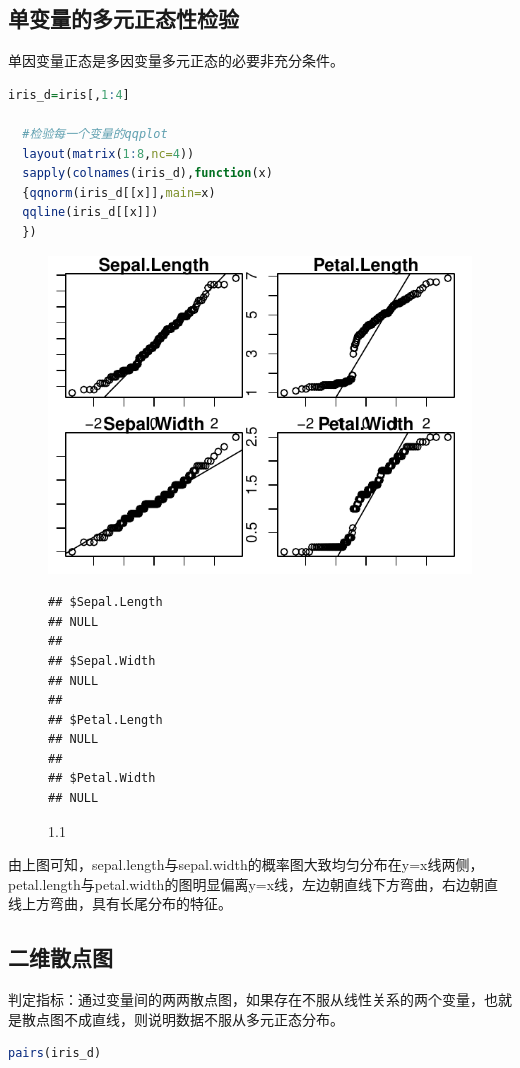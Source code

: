 \documentclass[11pt,a4paper]{article}\usepackage[]{graphicx}\usepackage[]{color}
\makeatletter
\def\maxwidth{ %
  \ifdim\Gin@nat@width>\linewidth
    \linewidth
  \else
    \Gin@nat@width
  \fi
}
\newenvironment{kframe}{%
 \def\at@end@of@kframe{}%
 \ifinner\ifhmode%
  \def\at@end@of@kframe{\end{minipage}}%
  \begin{minipage}{\columnwidth}%
 \fi\fi%
 \def\FrameCommand##1{\hskip\@totalleftmargin \hskip-\fboxsep
 \colorbox{shadecolor}{##1}\hskip-\fboxsep
     \hskip-\linewidth \hskip-\@totalleftmargin \hskip\columnwidth}%
 \MakeFramed {\advance\hsize-\width
   \@totalleftmargin\z@ \linewidth\hsize
   \@setminipage}}%
 {\par\unskip\endMakeFramed%
 \at@end@of@kframe}
\newenvironment{knitrout}{}{} %
\makeatother
\begin{document}
	\subsection{单变量的多元正态性检验}
	单因变量正态是多因变量多元正态的必要非充分条件。  
	\begin{lstlisting}[language=R, caption=单变量多元性检验,label={labelkode}]
  iris_d=iris[,1:4]

  #检验每一个变量的qqplot
  layout(matrix(1:8,nc=4))
  sapply(colnames(iris_d),function(x)
  {qqnorm(iris_d[[x]],main=x)
  qqline(iris_d[[x]])
  })
  \end{lstlisting}
	\begin{figure}[H]
  \begin{center}
\begin{knitrout}
\color{fgcolor}
\includegraphics[width=\maxwidth]{figure/unnamed-chunk-1-1} 
\begin{kframe}\begin{verbatim}
## $Sepal.Length
## NULL
## 
## $Sepal.Width
## NULL
## 
## $Petal.Length
## NULL
## 
## $Petal.Width
## NULL
\end{verbatim}
\end{kframe}
\end{knitrout}
  \caption{1.1}
  \end{center}
  \end{figure}
  由上图可知，sepal.length与sepal.width的概率图大致均匀分布在y=x线两侧，petal.length与petal.width的图明显偏离y=x线，左边朝直线下方弯曲，右边朝直线上方弯曲，具有长尾分布的特征。
	\subsection{二维散点图}
	判定指标：通过变量间的两两散点图，如果存在不服从线性关系的两个变量，也就是散点图不成直线，则说明数据不服从多元正态分布。
	\begin{lstlisting}[language=R, caption=变量之间相关性检验,label={labelkode}]
  pairs(iris_d)  
  \end{lstlisting}
  
\end{document}
